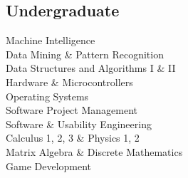 \documentclass[]{deedy-resume-openfont}
\begin{document}
\begin{minipage}[t]{0.35\textwidth}
\subsection{Undergraduate}
Machine Intelligence \\
Data Mining \& Pattern Recognition \\
Data Structures and Algorithms I \& II \\
Hardware \& Microcontrollers\\
Operating Systems \\
Software Project Management \\
Software \& Usability Engineering \\
Calculus 1, 2, 3 \& Physics 1, 2 \\
Matrix Algebra \& Discrete Mathematics\\
Game Development\\

%
%

\end{minipage} 
\hfill
\end{document}
